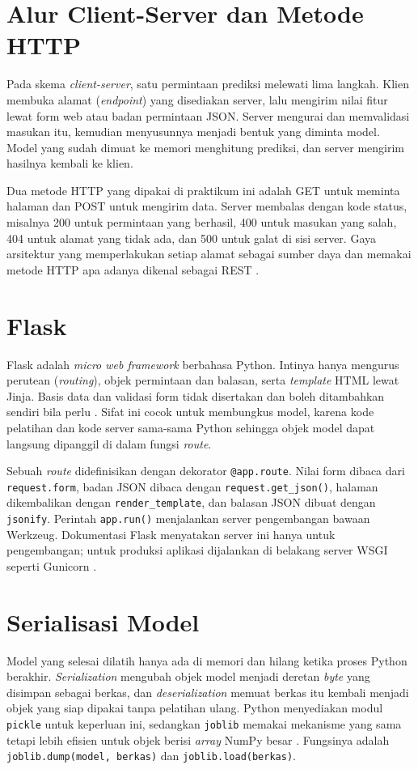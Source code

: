 \documentclass[a4paper,oneside,12pt]{report}
\begin{document}
\section{Alur Client-Server dan Metode HTTP}
Pada skema \textit{client-server}, satu permintaan prediksi melewati lima langkah. Klien membuka alamat (\textit{endpoint}) yang disediakan server, lalu mengirim nilai fitur lewat form web atau badan permintaan JSON. Server mengurai dan memvalidasi masukan itu, kemudian menyusunnya menjadi bentuk yang diminta model. Model yang sudah dimuat ke memori menghitung prediksi, dan server mengirim hasilnya kembali ke klien.

Dua metode HTTP yang dipakai di praktikum ini adalah GET untuk meminta halaman dan POST untuk mengirim data. Server membalas dengan kode status, misalnya 200 untuk permintaan yang berhasil, 400 untuk masukan yang salah, 404 untuk alamat yang tidak ada, dan 500 untuk galat di sisi server. Gaya arsitektur yang memperlakukan setiap alamat sebagai sumber daya dan memakai metode HTTP apa adanya dikenal sebagai REST \cite{fielding2000}.

\section{Flask}
Flask adalah \textit{micro web framework} berbahasa Python. Intinya hanya mengurus perutean (\textit{routing}), objek permintaan dan balasan, serta \textit{template} HTML lewat Jinja. Basis data dan validasi form tidak disertakan dan boleh ditambahkan sendiri bila perlu \cite{flask-quickstart}. Sifat ini cocok untuk membungkus model, karena kode pelatihan dan kode server sama-sama Python sehingga objek model dapat langsung dipanggil di dalam fungsi \textit{route}.

Sebuah \textit{route} didefinisikan dengan dekorator \texttt{@app.route}. Nilai form dibaca dari \texttt{request.form}, badan JSON dibaca dengan \texttt{request.get\_json()}, halaman dikembalikan dengan \texttt{render\_template}, dan balasan JSON dibuat dengan \texttt{jsonify}. Perintah \texttt{app.run()} menjalankan server pengembangan bawaan Werkzeug. Dokumentasi Flask menyatakan server ini hanya untuk pengembangan; untuk produksi aplikasi dijalankan di belakang server WSGI seperti Gunicorn \cite{flask-deploy}.

\section{Serialisasi Model}
Model yang selesai dilatih hanya ada di memori dan hilang ketika proses Python berakhir. \textit{Serialization} mengubah objek model menjadi deretan \textit{byte} yang disimpan sebagai berkas, dan \textit{deserialization} memuat berkas itu kembali menjadi objek yang siap dipakai tanpa pelatihan ulang. Python menyediakan modul \texttt{pickle} untuk keperluan ini, sedangkan \texttt{joblib} memakai mekanisme yang sama tetapi lebih efisien untuk objek berisi \textit{array} NumPy besar \cite{joblib-persistence}. Fungsinya adalah \texttt{joblib.dump(model, berkas)} dan \texttt{joblib.load(berkas)}.
\end{document}
